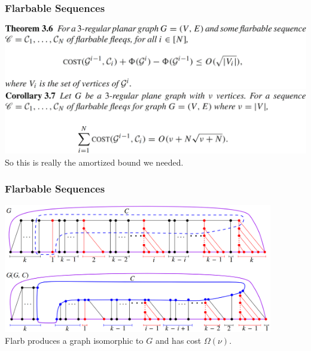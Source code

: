\begin{frame} \frametitle{Flarbable Sequences}
\begin{center}
	\includegraphics[width=14cm]{figs/3-6.png} \\ \vspace{0.5cm}
	\includegraphics[width=14cm]{figs/3-7.png} \\ \vspace{0.3cm}
	So this is really the amortized bound we needed.
\end{center}
\end{frame}

\begin{frame} \frametitle{Flarbable Sequences}
\begin{center}
	\includegraphics[width=11.75cm]{figs/halin-iso.png} \\ \vspace{0.5cm}
	Flarb produces a graph isomorphic to $G$ and has cost $\Omega \left( \nu \right)$.
\end{center}
\end{frame}